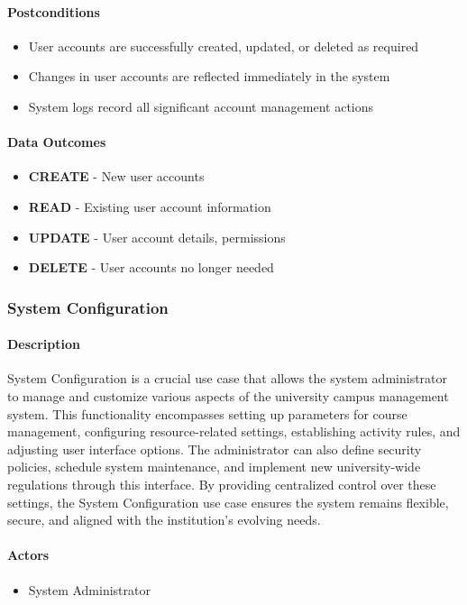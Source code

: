 \paragraph{Postconditions}
\begin{itemize}
    \item User accounts are successfully created, updated, or deleted as required
    \item Changes in user accounts are reflected immediately in the system
    \item System logs record all significant account management actions
\end{itemize}

\paragraph{Data Outcomes}
\begin{itemize}
    \item \textbf{CREATE} - New user accounts
    \item \textbf{READ} - Existing user account information
    \item \textbf{UPDATE} - User account details, permissions
    \item \textbf{DELETE} - User accounts no longer needed
\end{itemize}

\subsubsection{System Configuration}

\paragraph{Description}
System Configuration is a crucial use case that allows the system administrator to manage and customize various aspects of the university campus management system. This functionality encompasses setting up parameters for course management, configuring resource-related settings, establishing activity rules, and adjusting user interface options. The administrator can also define security policies, schedule system maintenance, and implement new university-wide regulations through this interface. By providing centralized control over these settings, the System Configuration use case ensures the system remains flexible, secure, and aligned with the institution's evolving needs.

\paragraph{Actors}
\begin{itemize}
    \item System Administrator
\end{itemize}

